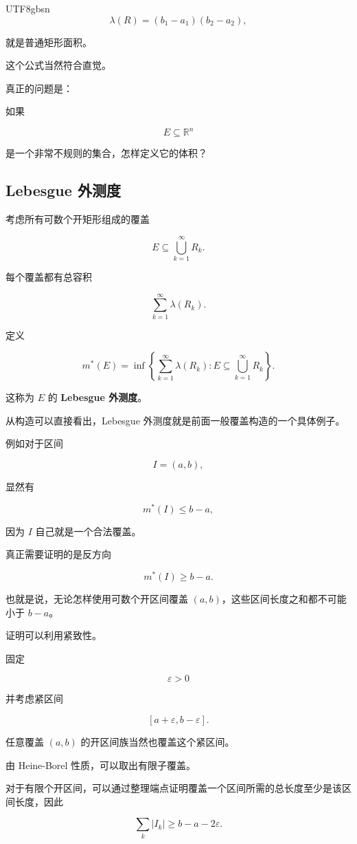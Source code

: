 \documentclass[11pt]{article}
\begin{document}
\begin{CJK*}{UTF8}{gbsn}
\[
\lambda(R)=(b_{1}-a_{1})(b_{2}-a_{2}),
\]

就是普通矩形面积。

这个公式当然符合直觉。

真正的问题是：

如果

\[
E\subseteq\mathbb{R}^{n}
\]

是一个非常不规则的集合，怎样定义它的体积？

\subsection{Lebesgue 外测度}

考虑所有可数个开矩形组成的覆盖

\[
E\subseteq\bigcup_{k=1}^{\infty}R_{k}.
\]

每个覆盖都有总容积

\[
\sum_{k=1}^{\infty}\lambda(R_{k}).
\]

定义

\[
m^{*}(E)=\inf\left\{\sum_{k=1}^{\infty}\lambda(R_{k}):E\subseteq\bigcup_{k=1}^{\infty}R_{k}\right\}.
\]

这称为 $E$ 的 \textbf{Lebesgue 外测度}。

从构造可以直接看出，Lebesgue 外测度就是前面一般覆盖构造的一个具体例子。

例如对于区间

\[
I=(a,b),
\]

显然有

\[
m^{*}(I)\leq b-a,
\]

因为 $I$ 自己就是一个合法覆盖。

真正需要证明的是反方向

\[
m^{*}(I)\geq b-a.
\]

也就是说，无论怎样使用可数个开区间覆盖 $(a,b)$，这些区间长度之和都不可能小于 $b-a$。

证明可以利用紧致性。

固定

\[
\varepsilon>0
\]

并考虑紧区间

\[
[a+\varepsilon,b-\varepsilon].
\]

任意覆盖 $(a,b)$ 的开区间族当然也覆盖这个紧区间。

由 Heine-Borel 性质，可以取出有限子覆盖。

对于有限个开区间，可以通过整理端点证明覆盖一个区间所需的总长度至少是该区间长度，因此

\[
\sum_{k}|I_{k}|\geq b-a-2\varepsilon.
\]


\end{CJK*}
\end{document}
